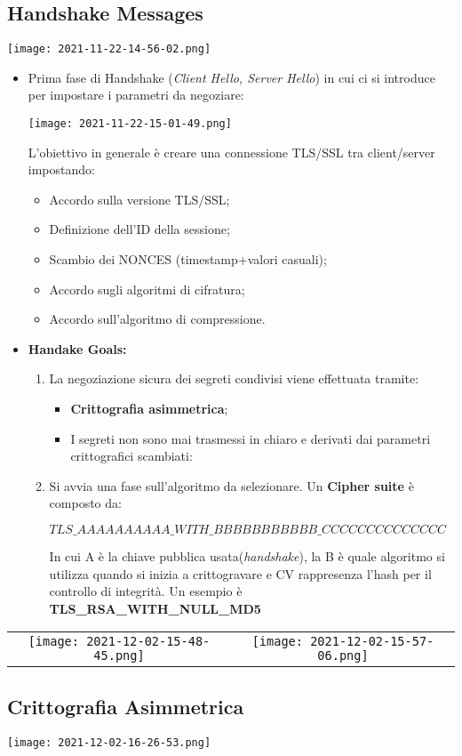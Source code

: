 \documentclass{article}
\theoremstyle{remark}
\begin{document}
\subsection{Handshake Messages}
\begin{center}
    \texttt{[image: 2021-11-22-14-56-02.png]}
\end{center}
\begin{itemize}
    \item Prima fase di Handshake (\emph{Client Hello, Server Hello}) in cui ci si introduce per impostare i parametri da negoziare:
        \begin{center}
            \texttt{[image: 2021-11-22-15-01-49.png]}
        \end{center}
        L'obiettivo in generale è creare una connessione TLS/SSL tra client/server impostando:\begin{itemize}
            \item Accordo sulla versione TLS/SSL;
            \item Definizione dell'ID della sessione;
            \item Scambio dei NONCES (timestamp+valori casuali);
            \item Accordo sugli algoritmi di cifratura;
            \item Accordo sull'algoritmo di compressione.
        \end{itemize}
    \item \textbf{Handake Goals:}\begin{enumerate}
        \item La negoziazione sicura dei segreti condivisi viene effettuata tramite:
        \begin{itemize}
            \item \textbf{Crittografia asimmetrica};
            \item  I segreti non sono mai trasmessi in chiaro e derivati dai parametri crittografici scambiati:
        \end{itemize}
        \item Si avvia una fase sull'algoritmo da selezionare. Un \textbf{Cipher suite} è composto da:\begin{center}
            \(TLS\_AAAAAAAAAA\_WITH\_BBBBBBBBBBB\_CCCCCCCCCCCCCC\)
        \end{center}
        In cui A è la chiave pubblica usata(\emph{handshake}), la B è quale algoritmo si utilizza quando si inizia a crittogravare e CV rappresenza l'hash per il controllo di integrità.
        Un esempio è \textbf{TLS\_RSA\_WITH\_NULL\_MD5}
    \end{enumerate}
\end{itemize}

\begin{tabular}{cc}
    \texttt{[image: 2021-12-02-15-48-45.png]}&
    \texttt{[image: 2021-12-02-15-57-06.png]}
\end{tabular}
\subsection{Crittografia Asimmetrica}
\begin{center}
    \texttt{[image: 2021-12-02-16-26-53.png]}
\end{center}
\end{document}
